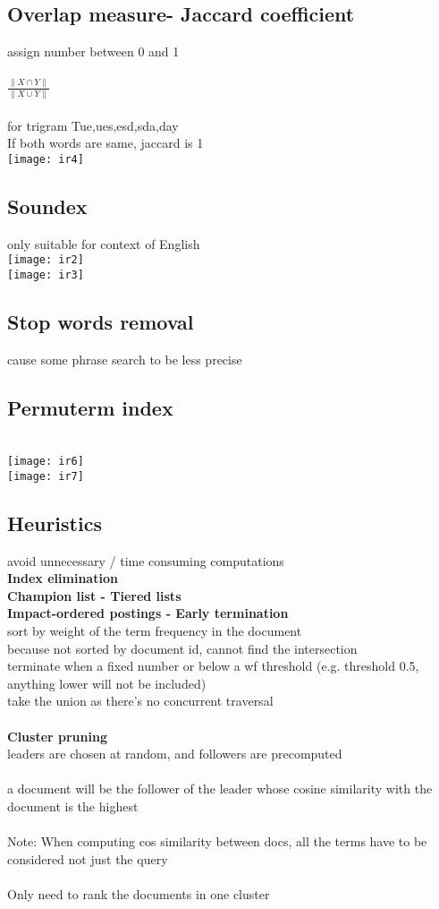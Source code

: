 \documentclass[11pt]{article}
\begin{document}
\begin{multicols*}{3}
\subsection*{Overlap measure- Jaccard coefficient}
assign number between 0 and 1
\\\\
$\frac{\| X \cap Y \|}{\| X \cup Y \| }$\\\\
for trigram Tue,ues,esd,sda,day\\ 
If both words are same, jaccard is 1\\
\texttt{[image: ir4]}\\
\subsection*{Soundex}
only suitable for context of English\\
\texttt{[image: ir2]}\\
\texttt{[image: ir3]}\\
\subsection*{Stop words removal}
cause some phrase search to be less precise
\subsection*{Permuterm index}\\
\texttt{[image: ir6]}\\
\texttt{[image: ir7]}
\subsection*{Heuristics}
avoid unnecessary / time consuming computations\\
\textbf{Index elimination}\\
\textbf{Champion list - Tiered lists}\\
\textbf{Impact-ordered postings - Early termination}\\
sort by weight of the term frequency in the document\\
because not sorted by document id, cannot find the intersection\\
terminate when a fixed number or below a wf threshold (e.g. threshold 0.5, anything lower will not be included)\\
take the union as there's no concurrent traversal\\\\
\textbf{Cluster pruning}\\
leaders are chosen at random, and followers are precomputed\\\\
a document will be the follower of the leader whose cosine similarity with the document is the highest\\\\
Note: When computing cos similarity between docs, all the terms have to be considered not just the query\\\\
Only need to rank the documents in one cluster

\end{multicols*}
\end{document}
